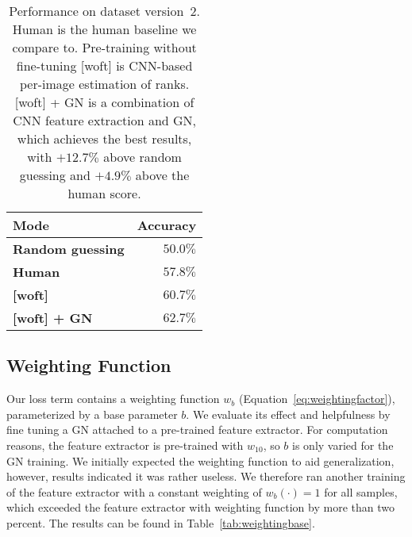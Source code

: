 \begin{table}
    \centering
    \begin{tabular}{lr}
        \textbf{Mode} & \textbf{Accuracy}\\\hline
        \textbf{Random guessing} & $50.0\%$\\
        \textbf{Human} & $57.8\%$ \\
        \textbf{[woft]} & $60.7\%$ \\
        \textbf{[woft] + GN} & $\bm{62.7\%}$
    \end{tabular}
    \caption[Performance on dataset version~2]{Performance on dataset version~2. Human is the human baseline we compare to. Pre-training without fine-tuning [woft] is CNN-based per-image estimation of ranks. [woft] + GN is a combination of CNN feature extraction and GN, which achieves the best results, with $+12.7\%$ above random guessing and $+4.9\%$ above the human score.}
    \label{tab:accuracyonv2}
\end{table}

\subsection{Weighting Function}

Our loss term contains a weighting function $w_b$ (Equation~\ref{eq:weightingfactor}), parameterized by a base parameter $b$. We evaluate its effect and helpfulness by fine tuning a GN attached to a pre-trained feature extractor. For computation reasons, the feature extractor is pre-trained with $w_{10}$, so $b$ is only varied for the GN training. We initially expected the weighting function to aid generalization, however, results indicated it was rather useless. We therefore ran another training of the feature extractor with a constant weighting of $w_b(\cdot)=1$ for all samples, which exceeded the feature extractor with weighting function by more than two percent. The results can be found in Table~\ref{tab:weightingbase}.

